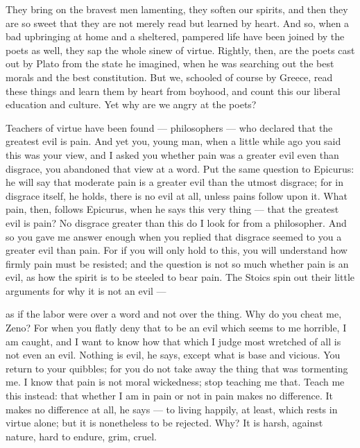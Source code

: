  They bring on the bravest men lamenting, they soften our spirits, and then they are so sweet that they are not merely read but learned by heart. And so, when a bad upbringing at home and a sheltered, pampered life have been joined by the poets as well, they sap the whole sinew of virtue. Rightly, then, are the poets cast out by Plato from the state he imagined, when he was searching out the best morals and the best constitution. But we, schooled of course by Greece, read these things and learn them by heart from boyhood, and count this our liberal education and culture. Yet why are we angry at the poets?

 Teachers of virtue have been found — philosophers — who declared that the greatest evil is pain. And yet you, young man, when a little while ago you said this was your view, and I asked you whether pain was a greater evil even than disgrace, you abandoned that view at a word. Put the same question to Epicurus: he will say that moderate pain is a greater evil than the utmost disgrace; for in disgrace itself, he holds, there is no evil at all, unless pains follow upon it. What pain, then, follows Epicurus, when he says this very thing — that the greatest evil is pain? No disgrace greater than this do I look for from a philosopher. And so you gave me answer enough when you replied that disgrace seemed to you a greater evil than pain. For if you will only hold to this, you will understand how firmly pain must be resisted; and the question is not so much whether pain is an evil, as how the spirit is to be steeled to bear pain. The Stoics spin out their little arguments for why it is not an evil —

 as if the labor were over a word and not over the thing. Why do you cheat me, Zeno? For when you flatly deny that to be an evil which seems to me horrible, I am caught, and I want to know how that which I judge most wretched of all is not even an evil. Nothing is evil, he says, except what is base and vicious. You return to your quibbles; for you do not take away the thing that was tormenting me. I know that pain is not moral wickedness; stop teaching me that. Teach me this instead: that whether I am in pain or not in pain makes no difference. It makes no difference at all, he says — to living happily, at least, which rests in virtue alone; but it is nonetheless to be rejected. Why? It is harsh, against nature, hard to endure, grim, cruel.

